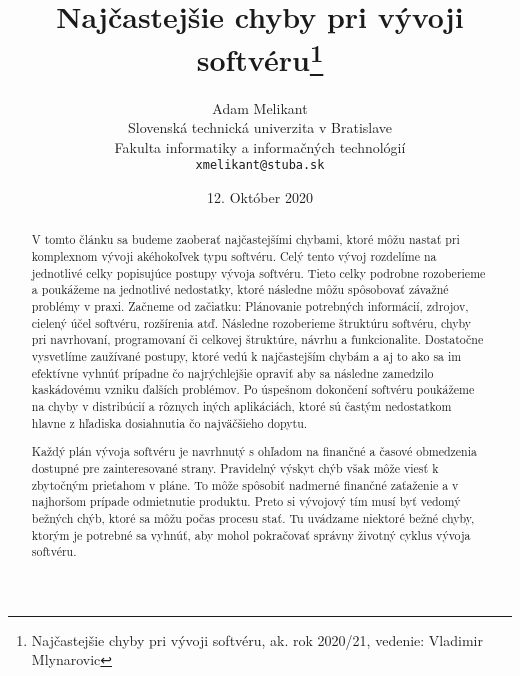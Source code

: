 \documentclass[10pt,twoside,slovak,a4paper]{article}
\title{Najčastejšie chyby pri vývoji softvéru\thanks{Najčastejšie chyby pri vývoji softvéru, ak. rok 2020/21, vedenie: Vladimir Mlynarovic}} %
\author{Adam Melikant\\[2pt]
	{\small Slovenská technická univerzita v Bratislave}\\
	{\small Fakulta informatiky a informačných technológií}\\
	{\small \texttt{xmelikant@stuba.sk}}
	}
\date{\small 12. Október 2020} %
\begin{document}
\maketitle

\begin{abstract}
V tomto článku sa budeme zaoberať najčastejšími chybami, ktoré môžu nastať pri komplexnom vývoji akéhokoľvek typu softvéru. Celý tento vývoj rozdelíme na jednotlivé celky popisujúce postupy vývoja softvéru. Tieto celky podrobne rozoberieme a poukážeme na jednotlivé nedostatky, ktoré následne môžu spôsobovať závažné problémy v praxi. Začneme od začiatku: Plánovanie potrebných informácií, zdrojov, cielený účel softvéru, rozšírenia atď. Následne rozoberieme štruktúru softvéru, chyby pri navrhovaní, programovaní či celkovej štruktúre, návrhu a funkcionalite. Dostatočne vysvetlíme zaužívané postupy, ktoré vedú k najčastejším chybám a aj to ako sa im efektívne vyhnúť prípadne čo najrýchlejšie opraviť aby sa následne zamedzilo kaskádovému vzniku ďalších problémov. Po úspešnom dokončení softvéru poukážeme na chyby v distribúcií a rôznych iných aplikáciách, ktoré sú častým nedostatkom hlavne z hľadiska dosiahnutia čo najväčšieho dopytu.

Každý plán vývoja softvéru je navrhnutý s ohľadom na finančné a časové obmedzenia dostupné pre zainteresované strany. Pravidelný výskyt chýb však môže viesť k zbytočným prieťahom v pláne. To môže spôsobiť nadmerné finančné zaťaženie a v najhoršom prípade odmietnutie produktu. Preto si vývojový tím musí byť vedomý bežných chýb, ktoré sa môžu počas procesu stať. Tu uvádzame niektoré bežné chyby, ktorým je potrebné sa vyhnúť, aby mohol pokračovať správny životný cyklus vývoja softvéru.
\end{abstract}




\end{document}
